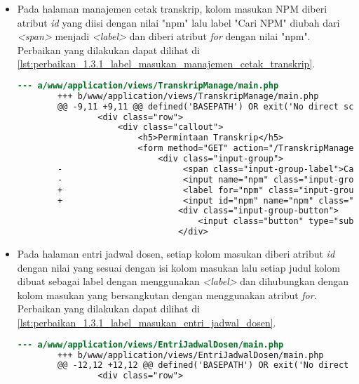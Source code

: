 \begin{itemize}
    \item Pada halaman manajemen cetak transkrip, kolom masukan NPM diberi atribut \textit{id} yang diisi dengan nilai "npm" lalu label "Cari NPM" diubah dari \textit{<span>} menjadi \textit{<label>} dan diberi atribut \textit{for} dengan nilai "npm". Perbaikan yang dilakukan dapat dilihat di \ref{lst:perbaikan_1.3.1_label_masukan_manajemen_cetak_transkrip}.
    \begin{lstlisting}[frame=single, label={lst:perbaikan_1.3.1_label_masukan_manajemen_cetak_transkrip}, language=diff, caption=Perbaikan Kriteria Sukses 1.3.1 - Tidak Terdapat Label pada Kolom Masukan di Halaman Manajemen Cetak Transkrip]
        --- a/www/application/views/TranskripManage/main.php
        +++ b/www/application/views/TranskripManage/main.php
        @@ -9,11 +9,11 @@ defined('BASEPATH') OR exit('No direct script access allowed');
                <div class="row">
                    <div class="callout">
                        <h5>Permintaan Transkrip</h5>
                        <form method="GET" action="/TranskripManage">
                            <div class="input-group">
        -                        <span class="input-group-label">Cari NPM:</span>
        -                        <input name="npm" class="input-group-field" type="text" placeholder="2013730013" maxlength="10" minlength="10"<?= $npmQuery === NULL ? '' : " value='$npmQuery'" ?>/>
        +                        <label for="npm" class="input-group-label">Cari NPM:</label>
        +                        <input id="npm" name="npm" class="input-group-field" type="text" placeholder="2013730013" maxlength="10" minlength="10"<?= $npmQuery === NULL ? '' : " value='$npmQuery'" ?>/>
                                <div class="input-group-button">
                                    <input class="button" type="submit" value="Cari"/>
                                </div>
    \end{lstlisting}

    \item Pada halaman entri jadwal dosen, setiap kolom masukan diberi atribut \textit{id} dengan nilai yang sesuai dengan isi kolom masukan lalu setiap judul kolom dibuat sebagai label dengan menggunakan \textit{<label>} dan dihubungkan dengan kolom masukan yang bersangkutan dengan menggunakan atribut \textit{for}. Perbaikan yang dilakukan dapat dilihat di \ref{lst:perbaikan_1.3.1_label_masukan_entri_jadwal_dosen}.
    \begin{lstlisting}[frame=single, label={lst:perbaikan_1.3.1_label_masukan_entri_jadwal_dosen}, language=diff, caption=Perbaikan Kriteria Sukses 1.3.1 - Tidak Terdapat Label pada Kolom Masukan di Halaman Entri Jadwal Dosen]
        --- a/www/application/views/EntriJadwalDosen/main.php
        +++ b/www/application/views/EntriJadwalDosen/main.php
        @@ -12,12 +12,12 @@ defined('BASEPATH') OR exit('No direct script access allowed');
                <div class="row">
        

\end{lstlisting}
\end{itemize}
